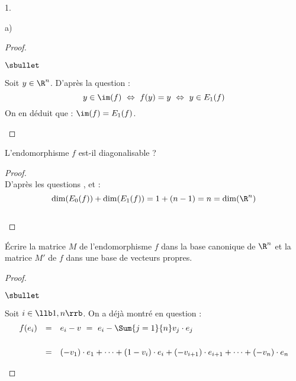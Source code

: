 \documentclass[11pt]{article}%
\begin{document}
\begin{noliste}{1.}
\begin{noliste}{a)}
\begin{proof}
\begin{noliste}{$\sbullet$}
    \item Soit $y\in \R^n$. D'après la question  :
    \[
     y \in \im(f) \ \Leftrightarrow \ f(y)=y \ \Leftrightarrow \
     y \in E_1(f)
    \]
    On en déduit que : $\im(f)=E_1(f)$.
    ~\\[-1.2cm]
   \end{noliste}
  \end{proof}

  \item L'endomorphisme $f$ est-il diagonalisable ?
  
    \begin{proof}~\\
      D'après les questions ,  et  :
   \[
    \dim(E_0(f)) + \dim(E_1(f)) = 1 + (n-1) = n = \dim(\R^n)
   \]
   ~\\[-1.2cm]
  \end{proof}
 \end{noliste}
 
 \item Écrire la matrice $M$ de l'endomorphisme $f$ dans la base 
  canonique de $\R^n$ et la matrice $M'$ de $f$ dans une base de 
  vecteurs propres.
  
  \begin{proof}~
   \begin{noliste}{$\sbullet$}
    \item Soit $i\in \llb 1,n \rrb$. On a déjà montré en question 
    \itbf{3.c)} :
    \[
     \begin{array}{rcl}
       f(e_i) & = & e_i - v \ = \ e_i - \Sum{j=1}{n} v_j \cdot e_j
       \\[.6cm]
       & = & (-v_1) \cdot e_1 + \cdots + (1-v_i) \cdot e_i + (- v_{i+1})
       \cdot e_{i+1} + \cdots + (- v_n) \cdot e_n
     \end{array}
    \]
    


\end{noliste}
\end{proof}
\end{noliste}
\end{document}
